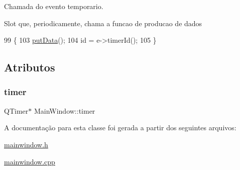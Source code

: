 Chamada do evento temporario. 

Slot que, periodicamente, chama a funcao de producao de dados
\begin{DoxyCode}
99                                          \{
103     \hyperlink{class_main_window_afdfeb13ec363b0eb8ecacaf0aa13b605}{putData}();
104     \textcolor{keywordtype}{id} = e->timerId();
105 \}
\end{DoxyCode}


\subsection{Atributos}
\mbox{\label{class_main_window_a356578805ed1248a7f2807434cb0e5ee}} 
\subsubsection{\texorpdfstring{timer}{timer}}
{\footnotesize\ttfamily Q\+Timer$\ast$ Main\+Window\+::timer}



A documentação para esta classe foi gerada a partir dos seguintes arquivos\+:\begin{DoxyCompactItemize}
\item 
\hyperlink{mainwindow_8h}{mainwindow.\+h}\item 
\hyperlink{mainwindow_8cpp}{mainwindow.\+cpp}\end{DoxyCompactItemize}
